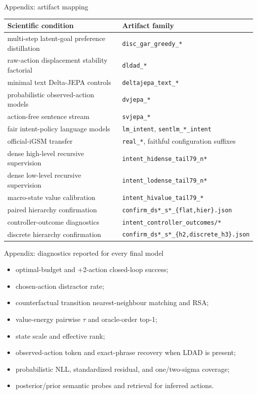 \documentclass[aspectratio=169,10pt]{beamer}
\begin{document}
\appendix
\begin{frame}{Appendix: artifact mapping}
\scriptsize
\begin{tabular}{p{}p{}}
\toprule
Scientific condition & Artifact family\\
\midrule
multi-step latent-goal preference distillation & \texttt{disc\_gar\_greedy\_*}\\
raw-action displacement stability factorial & \texttt{dldad\_*}\\
minimal text Delta-JEPA controls & \texttt{deltajepa\_text\_*}\\
probabilistic observed-action models & \texttt{dvjepa\_*}\\
action-free sentence stream & \texttt{svjepa\_*}\\
fair intent-policy language models & \texttt{lm\_intent}, \texttt{sentlm\_*\_intent}\\
official-iGSM transfer & \texttt{real\_*}, faithful configuration suffixes\\
dense high-level recursive supervision & \texttt{intent\_hidense\_tail79\_n*}\\
dense low-level recursive supervision & \texttt{intent\_lodense\_tail79\_n*}\\
macro-state value calibration & \texttt{intent\_hivalue\_tail79\_*}\\
paired hierarchy confirmation & \texttt{confirm\_ds*\_s*\_\{flat,hier\}.json}\\
controller-outcome diagnostics & \texttt{intent\_controller\_outcomes/*}\\
discrete hierarchy confirmation & \texttt{confirm\_ds*\_s*\_\{h2,discrete\_h3\}.json}\\
\bottomrule
\end{tabular}
\end{frame}

\begin{frame}{Appendix: diagnostics reported for every final model}
\small
\begin{itemize}
\item optimal-budget and +2-action closed-loop success;
\item chosen-action distractor rate;
\item counterfactual transition nearest-neighbour matching and RSA;
\item value-energy pairwise $\tau$ and oracle-order top-1;
\item state scale and effective rank;
\item observed-action token and exact-phrase recovery when LDAD is present;
\item probabilistic NLL, standardized residual, and one/two-sigma coverage;
\item posterior/prior semantic probes and retrieval for inferred actions.
\end{itemize}
\end{frame}
\end{document}
